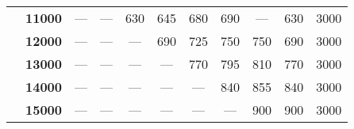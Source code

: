 \documentclass[12pt,a4paper,twoside,openright,titlepage,final]{article}
\begin{document}
\begin{table}[htbp!]
{\begin{tabular}{|ccccccccccc|}
\multicolumn{1}{|c|}{}                                & \textbf{11000}        & ---           & ---           & 630           & 645           & 680            & 690            & ---            & 630                                                                 & 3000                                                                  \\
\multicolumn{1}{|c|}{}                                & \textbf{12000}        & ---           & ---           & ---           & 690           & 725            & 750            & 750            & 690                                                                 & 3000                                                                  \\
\multicolumn{1}{|c|}{}                                & \textbf{13000}        & ---           & ---           & ---           & ---           & 770            & 795            & 810            & 770                                                                 & 3000                                                                  \\
\multicolumn{1}{|c|}{}                                & \textbf{14000}        & ---           & ---           & ---           & ---           & ---            & 840            & 855            & 840                                                                 & 3000                                                                  \\
\multicolumn{1}{|c|}{}                                & \textbf{15000}        & ---           & ---           & ---           & ---           & ---            & ---            & 900            & 900                                                                 & 3000                                                                  \\ \hline
\end{tabular}
}
\end{table}
\end{document}
